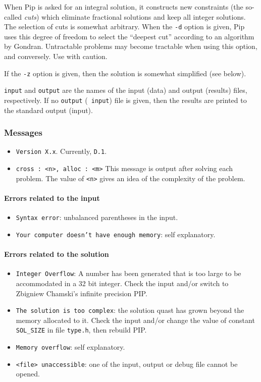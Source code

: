 \documentclass[12pt,a4paper]{article}
\begin{document}
When Pip is asked for an integral solution, it constructs new constraints
(the so-called {\em cuts}) which eliminate fractional solutions and keep
all integer solutions. The selection of cuts is somewhat arbitrary. When
the {\tt -d} option is given, Pip uses this degree of freedom to select
the ``deepest cut'' according to an algorithm by Gondran. Untractable
problems may become tractable when using this option, and conversely.
Use with caution.

If the {\tt -z} option is given, then the solution is somewhat simplified
(see below).

{\tt input} and {\tt output} are the names of the input (data) and
output (results) files, respectively. If no {\tt output} ({\tt
input}) file is given, then the results are printed to the standard
output (input).


\subsubsection{Messages}
\begin{itemize}

\item {\tt Version X.x}. Currently, {\tt D.1}.

\item {\tt cross : <n>, alloc : <m>} This message is output after solving
 each problem. The value of {\tt <n>} gives an idea of the complexity of
 the problem.
\end{itemize}

\paragraph{Errors related to the input}
\begin{itemize}
\item {\tt Syntax error}: unbalanced parentheses in the input.

\item {\tt Your computer doesn't have enough memory}: self explanatory.
\end{itemize}
\paragraph{Errors related to the solution}
\begin{itemize}
\item {\tt Integer Overflow}: A number has been generated that is too large
to be accommodated in a 32 bit integer. Check the input and/or switch
to Zbigniew Chamski's infinite precision PIP.

\item {\tt The solution is too complex}: the solution quast has grown beyond
the memory allocated to it. Check the input and/or change the value of
constant {\tt SOL\_SIZE} in file {\tt type.h}, then rebuild PIP.

\item {\tt Memory overflow}: self explanatory.

\item {\tt <file> unaccessible}: one of the input, output or debug file
cannot be opened.
\end{itemize}
\end{document}
